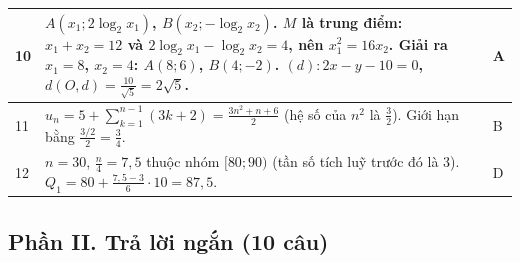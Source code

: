 \documentclass[11pt,a4paper]{article}
\begin{document}
\begin{longtable}{|p{0.8cm}|p{13.6cm}|>{\centering\arraybackslash}p{1.2cm}|}
10 & $A(x_1;2\log_2x_1)$, $B(x_2;-\log_2x_2)$. $M$ là trung điểm: $x_1+x_2=12$ và $2\log_2x_1-\log_2x_2=4$, nên $x_1^2=16x_2$. Giải ra $x_1=8$, $x_2=4$: $A(8;6)$, $B(4;-2)$. $(d)\colon 2x-y-10=0$, $d(O,d)=\frac{10}{\sqrt5}=2\sqrt5$. & A\\ \hline
11 & $u_n=5+\sum_{k=1}^{n-1}(3k+2)=\frac{3n^2+n+6}{2}$ (hệ số của $n^2$ là $\frac32$). Giới hạn bằng $\frac{3/2}{2}=\frac34$. & B\\ \hline
12 & $n=30$, $\frac n4=7{,}5$ thuộc nhóm $[80;90)$ (tần số tích luỹ trước đó là 3). $Q_1=80+\frac{7{,}5-3}{6}\cdot10=87{,}5$. & D\\ \hline
\end{longtable}

\subsection{Phần II. Trả lời ngắn (10 câu)}
\end{document}
